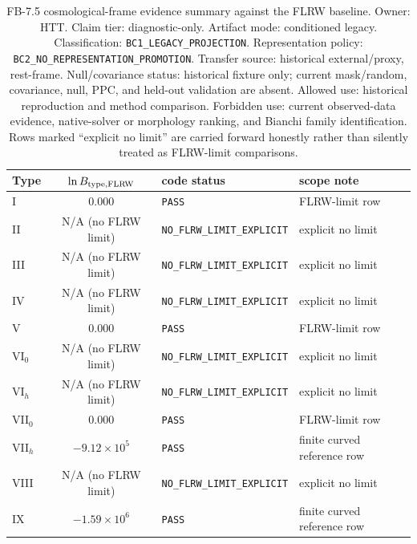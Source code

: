 \begin{table}[t]
\caption{FB-7.5 cosmological-frame evidence summary against the FLRW
baseline.  Owner: HTT.  Claim tier: diagnostic-only.  Artifact mode:
conditioned legacy.  Classification:
\texttt{BC1\_LEGACY\_PROJECTION}.
Representation policy:
\texttt{BC2\_NO\_REPRESENTATION\_PROMOTION}.  Transfer source:
historical external/proxy,
rest-frame.  Null/covariance status: historical fixture only; current
mask/random, covariance, null, PPC, and held-out validation are absent.
Allowed use: historical reproduction and method comparison.  Forbidden
use: current observed-data evidence, native-solver or morphology ranking,
and Bianchi family identification.  Rows marked ``explicit no limit'' are
carried forward honestly rather than silently treated as FLRW-limit
comparisons.}
\label{tab:fb7_lnB_11types}
\centering
\scriptsize
\begin{tabular}{lcll}
\hline\hline
Type & $\ln B_{\rm type,FLRW}$ & code status & scope note \\
\hline
I         & $0.000$                  & \texttt{PASS} & FLRW-limit row \\
II        & \multicolumn{1}{c}{N/A (no FLRW limit)} & \texttt{NO\_FLRW\_LIMIT\_EXPLICIT} & explicit no limit \\
III       & \multicolumn{1}{c}{N/A (no FLRW limit)} & \texttt{NO\_FLRW\_LIMIT\_EXPLICIT} & explicit no limit \\
IV        & \multicolumn{1}{c}{N/A (no FLRW limit)} & \texttt{NO\_FLRW\_LIMIT\_EXPLICIT} & explicit no limit \\
V         & $0.000$                  & \texttt{PASS} & FLRW-limit row \\
VI$_0$    & \multicolumn{1}{c}{N/A (no FLRW limit)} & \texttt{NO\_FLRW\_LIMIT\_EXPLICIT} & explicit no limit \\
VI$_h$    & \multicolumn{1}{c}{N/A (no FLRW limit)} & \texttt{NO\_FLRW\_LIMIT\_EXPLICIT} & explicit no limit \\
VII$_0$   & $0.000$                  & \texttt{PASS} & FLRW-limit row \\
VII$_h$   & $-9.12 \times 10^{5}$    & \texttt{PASS} & finite curved reference row \\
VIII      & \multicolumn{1}{c}{N/A (no FLRW limit)} & \texttt{NO\_FLRW\_LIMIT\_EXPLICIT} & explicit no limit \\
IX        & $-1.59 \times 10^{6}$    & \texttt{PASS} & finite curved reference row \\
\hline\hline
\end{tabular}
\end{table}

